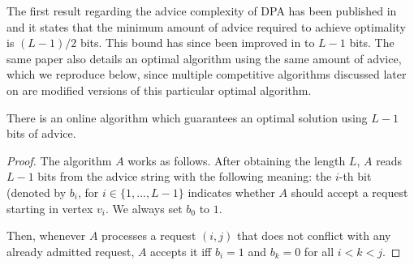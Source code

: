 The first result regarding the advice complexity of DPA has been published
in \cite{komm-thesis} and it states that the minimum amount of advice
required to achieve optimality is $(L-1)/2$ bits. This bound has since
been improved in \cite{sofsem2014} to $L-1$ bits.  The same paper also
details an optimal algorithm using the same amount of advice, which we
reproduce below, since multiple competitive algorithms discussed later on
are modified versions of this particular optimal algorithm.

\begin{theorem}\label{theorem:dpa-optimal}
    There is an online algorithm which guarantees an optimal solution
    using $L-1$ bits of advice.
\end{theorem}

\begin{proof}
    The algorithm $A$ works as follows. After obtaining the length $L$,
    $A$ reads $L-1$ bits from the advice string with the following
    meaning: the $i$-th bit (denoted by $b_i$, for $i \in \{1, \dots,
    L-1\}$ indicates whether $A$ should accept a request starting in
    vertex $v_i$. We always set $b_0$ to $1$.

    Then, whenever $A$ processes a request $(i, j)$ that does not conflict
    with any already admitted request, $A$ accepts it iff $b_i = 1$ and
    $b_k = 0$ for all $i < k < j$.
\end{proof}
